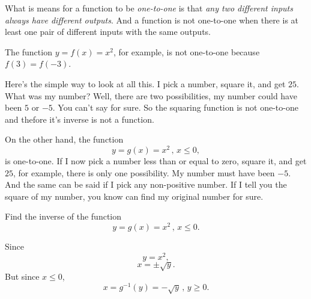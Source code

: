 \documentclass{ximera}
\begin{document}
What is means for a function to be \emph{one-to-one} is that \emph{any two different inputs always have different outputs}. And a function is not one-to-one when there is at least one pair of different inputs with the same outputs.

The function $y=f(x) = x^2$, for example, is not one-to-one because $f(3) = f(-3)$.

Here's the simple way to look at all this. I pick a number, square it, and get $25$. What was my number? Well, there are two possibilities, my number could have been $5$ or $-5$. You can't say for sure. So the squaring function is not one-to-one and thefore it's inverse is not a function. 

On the other hand, the function
\[
   y = g(x) = x^2 \, , \, x \leq 0,
\]
 is one-to-one. If I now pick a number less than or equal to zero, square it, and get $25$, for example, there is only one possibility. My number must have been $-5$. And the same can be said if I pick any non-positive number. If I tell you the square of my number, you know can find my original number for sure.
 
\begin{example} \label{Ev77337}
Find the inverse of the function 
\[
   y = g(x) = x^2 \, , \, x \leq 0.
\]

\begin{explanation}
Since
\[
   y = x^2 ,
\]
\[
    x = \pm \sqrt{y}.
\]
But since $x\leq 0$, 
\[
   x = g^{-1}(y) = -\sqrt{y} \, , \, y \geq 0.
\]
\end{explanation}
\end{example}
\end{document}
